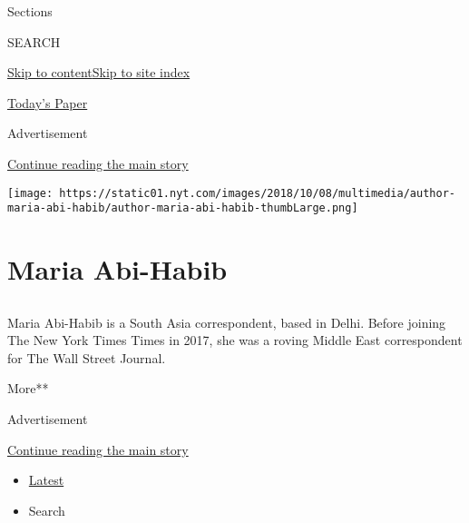Sections

SEARCH

\protect\hyperlink{site-content}{Skip to
content}\protect\hyperlink{site-index}{Skip to site index}

\href{https://myaccount.nytimes.com/auth/login?response_type=cookie\&client_id=vi}{}

\href{https://www.nytimes.com/section/todayspaper}{Today's Paper}

Advertisement

\protect\hyperlink{after-top}{Continue reading the main story}

\texttt{[image: https://static01.nyt.com/images/2018/10/08/multimedia/author-maria-abi-habib/author-maria-abi-habib-thumbLarge.png]}

\hypertarget{maria-abi-habib}{%
\section{Maria Abi-Habib}\label{maria-abi-habib}}

\subsection{}

Maria Abi-Habib is a South Asia correspondent, based in Delhi. Before
joining The New York Times Times in 2017, she was a roving Middle East
correspondent for The Wall Street Journal.

More**

Advertisement

\protect\hyperlink{after-mid1}{Continue reading the main story}

\begin{itemize}
\tightlist
\item
  \protect\hyperlink{stream-panel}{Latest}
\item
  Search
\end{itemize}


